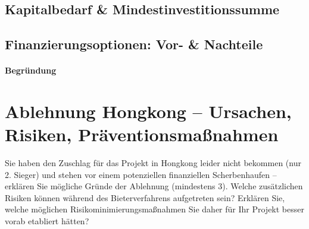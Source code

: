 \documentclass[
%
ngerman %
%
numeric %
]{wbh-assignment}
\begin{document}
\subsection{Kapitalbedarf \& Mindestinvestitionssumme}

\subsection{Finanzierungsoptionen: Vor- \& Nachteile}

\paragraph{Begründung}

\clearpage

\section{Ablehnung Hongkong – Ursachen, Risiken, Präventionsmaßnahmen}
\label{sec:hongkong_risiken}

\begin{aufgabenstellung}
Sie haben den Zuschlag für das Projekt in Hongkong leider nicht bekommen (nur 2. Sieger) und stehen vor einem potenziellen finanziellen Scherbenhaufen – erklären Sie mögliche Gründe der Ablehnung (mindestens 3). Welche zusätzlichen Risiken können während des Bieterverfahrens aufgetreten sein? Erklären Sie, welche möglichen Risikominimierungsmaßnahmen Sie daher für Ihr Projekt besser vorab etabliert hätten?
\end{aufgabenstellung}
\end{document}
